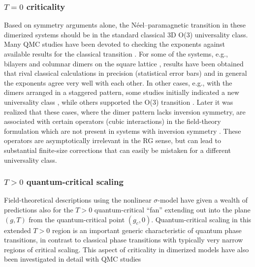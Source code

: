 \documentclass[range]{ar2e}
\begin{document}
\subsubsection{$T=0$ criticality}
Based on symmetry arguments alone, the N\'eel--paramagnetic transition in these dimerized systems
should be in the standard classical 3D O($3$) universality class. Many QMC studies 
have been devoted to checking the exponents against available results for the classical transition \cite{Sandvik94,Troyer96,Matsumoto01,Wang06,Wenzel08,Wenzel09}.
For some of the systems, e.g., bilayers \cite{Wang06} and columnar dimers on the square lattice \cite{Matsumoto01,Wenzel09,Sandvik10b}, results have been 
obtained that rival classical calculations in precision (statistical error bars) and in general the exponents agree very well with each other. In other 
cases, e.g., with the dimers arranged in a staggered pattern, some studies initially indicated a new universality class \cite{Wenzel08}, while others
supported the O($3$) transition \cite{Jiang12}.  Later it was realized that these cases, where the dimer pattern lacks inversion symmetry, are associated 
with certain operators (cubic interactions) in the field-theory formulation  which are not present in systems with inversion symmetry \cite{Fritz11}. 
These operators are asymptotically irrelevant in the RG sense, but can lead to substantial finite-size corrections that can easily be mistaken for a 
different universality class.

\subsubsection{$T>0$ quantum-critical scaling}
Field-theoretical descriptions using the nonlinear $\sigma$-model \cite{Haldane83,Chakravarty89,Chubukov94} have given a wealth of 
predictions also for the $T>0$ quantum-critical ``fan'' extending out into the plane $(g,T)$  from the quantum-critical point $(g_c,0)$. Quantum-critical
scaling in this extended $T>0$ region is an important generic characteristic of quantum phase transitions, in contrast to classical phase transitions with typically 
very narrow regions of critical scaling. This aspect of criticality in dimerized models have also been investigated in detail with QMC 
studies \cite{Sandvik95,Brenig06,Sandvik11a}
\end{document}
